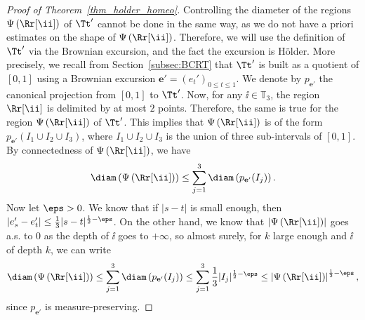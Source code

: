 \begin{proof}[Proof of Theorem~\ref{thm_holder_homeo}]
Controlling the diameter of the regions $\Psi \left( \Rr[\ii]\right)$ of $\Tt'$ cannot be done in the same way, as we do not have a priori estimates on the shape of $\Psi \left( \Rr[\ii]\right)$. Therefore, we will use the definition of $\Tt'$ via the Brownian excursion, and the fact the excursion is Hölder.
More precisely, we recall from Section~\ref{subsec:BCRT} that $\Tt'$ is built as a quotient of $[0,1]$ using a Brownian excursion $\mathbf{e}'=\left( e_t' \right)_{0 \leq t \leq 1}$. We denote by $p_{\mathbf{e}'}$ the canonical projection from $[0,1]$ to $\Tt'$.
Now, for any $\ii \in \mathbb{T}_3$, the region $\Rr[\ii]$ is delimited by at most $2$ points.
Therefore, the same is true for the region $\Psi \left( \Rr[\ii] \right)$ of $\Tt'$.
This implies that $\Psi \left( \Rr[\ii] \right)$ is of the form $p_{\mathbf{e}'}(I_1 \cup I_2 \cup I_3)$, where $I_1 \cup I_2 \cup I_3$ is the union of three sub-intervals of $[0,1]$.
By connectedness of $\Psi \left( \Rr[\ii] \right)$, we have
\[ \diam \left( \Psi \left( \Rr[\ii] \right) \right) \leq \sum_{j=1}^3 \diam \left( p_{\mathbf{e'}}(I_j) \right). \]
Now let $\eps>0$. We know that if $|s-t|$ is small enough, then $|e'_s-e'_t| \leq \frac13 |s-t|^{\frac12-\eps}$. On the other hand, we know that $\left| \Psi \left( \Rr[\ii] \right)\right| $ goes a.s. to $0$ as the depth of $\ii$ goes to $+\infty$, so almost surely, for $k$ large enough and $\ii$ of depth $k$, we can write
\begin{equation}
\label{eq:diam of region is smaller than mass to some power}
\diam \left( \Psi \left( \Rr[\ii] \right) \right) \leq \sum_{j=1}^3 \diam \left( p_{\mathbf{e'}}(I_j) \right) \leq \sum_{j=1}^3 \frac13 |I_j|^{\frac12-\eps} \leq \left| \Psi \left( \Rr[\ii] \right) \right|^{\frac12-\eps},
\end{equation}
since $p_{\mathbf{e}'}$ is measure-preserving.


\end{proof}
